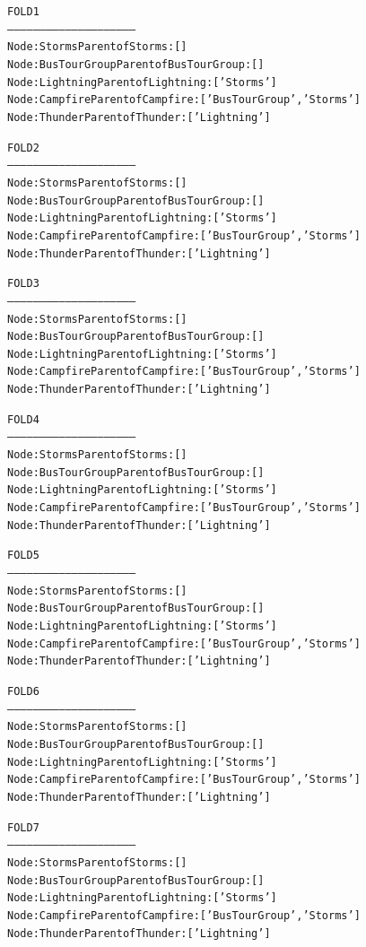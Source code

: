 \begin{shaded}
\tiny
\begin{alltt}
FOLD 1
-----------------------------------------------------------
Node : Storms   Parent of Storms : []
Node : BusTourGroup   Parent of BusTourGroup : []
Node : Lightning  Parent of Lightning : ['Storms']
Node : Campfire   Parent of Campfire : ['BusTourGroup', 'Storms']
Node : Thunder  Parent of Thunder : ['Lightning']

FOLD 2
-----------------------------------------------------------
Node : Storms   Parent of Storms : []
Node : BusTourGroup   Parent of BusTourGroup : []
Node : Lightning  Parent of Lightning : ['Storms']
Node : Campfire   Parent of Campfire : ['BusTourGroup', 'Storms']
Node : Thunder  Parent of Thunder : ['Lightning']

FOLD 3
-----------------------------------------------------------
Node : Storms   Parent of Storms : []
Node : BusTourGroup   Parent of BusTourGroup : []
Node : Lightning  Parent of Lightning : ['Storms']
Node : Campfire   Parent of Campfire : ['BusTourGroup', 'Storms']
Node : Thunder  Parent of Thunder : ['Lightning']

FOLD 4
-----------------------------------------------------------
Node : Storms   Parent of Storms : []
Node : BusTourGroup   Parent of BusTourGroup : []
Node : Lightning  Parent of Lightning : ['Storms']
Node : Campfire   Parent of Campfire : ['BusTourGroup', 'Storms']
Node : Thunder  Parent of Thunder : ['Lightning']

FOLD 5
-----------------------------------------------------------
Node : Storms   Parent of Storms : []
Node : BusTourGroup   Parent of BusTourGroup : []
Node : Lightning  Parent of Lightning : ['Storms']
Node : Campfire   Parent of Campfire : ['BusTourGroup', 'Storms']
Node : Thunder  Parent of Thunder : ['Lightning']

FOLD 6
-----------------------------------------------------------
Node : Storms   Parent of Storms : []
Node : BusTourGroup   Parent of BusTourGroup : []
Node : Lightning  Parent of Lightning : ['Storms']
Node : Campfire   Parent of Campfire : ['BusTourGroup', 'Storms']
Node : Thunder  Parent of Thunder : ['Lightning']

FOLD 7
-----------------------------------------------------------
Node : Storms   Parent of Storms : []
Node : BusTourGroup   Parent of BusTourGroup : []
Node : Lightning  Parent of Lightning : ['Storms']
Node : Campfire   Parent of Campfire : ['BusTourGroup', 'Storms']
Node : Thunder  Parent of Thunder : ['Lightning']


\end{alltt}
\end{shaded}
